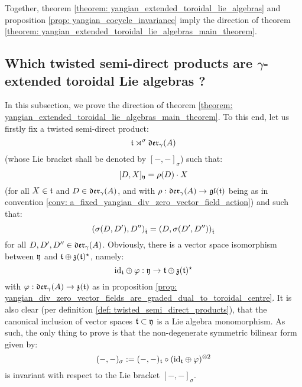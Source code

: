         Together, theorem \ref{theorem: yangian_extended_toroidal_lie_algebras} and proposition \ref{prop: yangian_cocycle_invariance} imply the  direction of theorem \ref{theorem: yangian_extended_toroidal_lie_algebras_main_theorem}.

    \subsection{Which twisted semi-direct products are \texorpdfstring{$\gamma$}{}-extended toroidal Lie algebras ?}
    
        In this subsection, we prove the  direction of theorem \ref{theorem: yangian_extended_toroidal_lie_algebras_main_theorem}. To this end, let us firstly fix a twisted semi-direct product:
            $$\mathfrak{t} \rtimes^{\sigma} \mathfrak{der}_{\gamma}(A)$$
        (whose Lie bracket shall be denoted by $[-, -]_{\sigma}$) such that:
            $$[D, X]_{\mathfrak{y}} = \rho(D) \cdot X$$
        (for all $X \in \mathfrak{t}$ and $D \in \mathfrak{der}_{\gamma}(A)$, and with $\rho: \mathfrak{der}_{\gamma}(A) \to \mathfrak{gl}(\mathfrak{t})$ being as in convention \ref{conv: a_fixed_yangian_div_zero_vector_field_action}) and such that:
            $$(\sigma(D, D'), D'')_{\hat{\mathfrak{t}}} = (D, \sigma(D', D''))_{\hat{\mathfrak{t}}}$$
        for all $D, D', D'' \in \mathfrak{der}_{\gamma}(A)$. Obviously, there is a vector space isomorphism between $\mathfrak{y}$ and $\mathfrak{t} \oplus \mathfrak{z}(\mathfrak{t})^{\star}$, namely:
            $$\mathrm{id}_{\mathfrak{t}} \oplus \varphi: \mathfrak{y} \to \mathfrak{t} \oplus \mathfrak{z}(\mathfrak{t})^{\star}$$
        with $\varphi: \mathfrak{der}_{\gamma}(A) \to \mathfrak{z}(\mathfrak{t})$ as in proposition \ref{prop: yangian_div_zero_vector_fields_are_graded_dual_to_toroidal_centre}. It is also clear (per definition \ref{def: twisted_semi_direct_products}), that the canonical inclusion of vector spaces $\mathfrak{t} \subset \mathfrak{y}$ is a Lie algebra monomorphism. As such, the only thing to prove is that the non-degenerate symmetric bilinear form given by:
            $$(-, -)_{\sigma} := (-, -)_{\toroidal} \circ (\id_{\toroidal} \oplus \varphi)^{\tensor 2}$$
        is invariant with respect to the Lie bracket $[-, -]_{\sigma}$.

